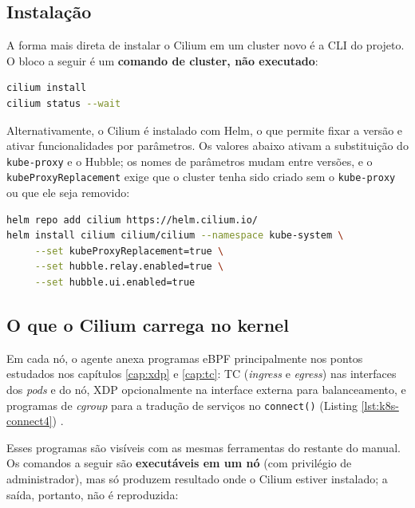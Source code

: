 \subsection*{Instalação}

A forma mais direta de instalar o Cilium em um cluster novo é a CLI do projeto. O
bloco a seguir é um \textbf{comando de cluster, não executado}:

\begin{lstlisting}[language=bash, caption={Instalação e verificação do Cilium com a CLI (comando de cluster, não executado).}, label=lst:cilium-install]
cilium install
cilium status --wait
\end{lstlisting}

Alternativamente, o Cilium é instalado com Helm, o que permite fixar a versão e ativar
funcionalidades por parâmetros. Os valores abaixo ativam a substituição do
\texttt{kube-proxy} e o Hubble; os nomes de parâmetros mudam entre versões, e o
\texttt{kubeProxyReplacement} exige que o cluster tenha sido criado sem o
\texttt{kube-proxy} ou que ele seja removido:

\begin{lstlisting}[language=bash, caption={Instalação via Helm com Hubble e substituição do kube-proxy (comando de cluster, não executado).}, label=lst:cilium-helm]
helm repo add cilium https://helm.cilium.io/
helm install cilium cilium/cilium --namespace kube-system \
     --set kubeProxyReplacement=true \
     --set hubble.relay.enabled=true \
     --set hubble.ui.enabled=true
\end{lstlisting}

\subsection*{O que o Cilium carrega no kernel}

Em cada nó, o agente anexa programas eBPF principalmente nos pontos estudados nos
capítulos \ref{cap:xdp} e \ref{cap:tc}: TC (\textit{ingress} e \textit{egress}) nas
interfaces dos \textit{pods} e do nó, XDP opcionalmente na interface externa para
balanceamento, e programas de \textit{cgroup} para a tradução de serviços no
\texttt{connect()} (Listing \ref{lst:k8s-connect4}) \cite{ciliumdocs}.

Esses programas são visíveis com as mesmas ferramentas do restante do manual. Os
comandos a seguir são \textbf{executáveis em um nó} (com privilégio de administrador),
mas só produzem resultado onde o Cilium estiver instalado; a saída, portanto, não é
reproduzida:

